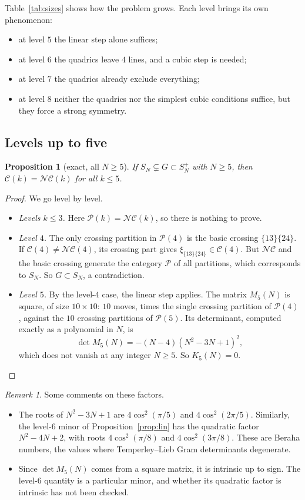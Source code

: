 \documentclass[11pt]{amsart}
\newtheorem{proposition}[theorem]{Proposition}
\theoremstyle{definition}
\theoremstyle{remark}
\newtheorem{remark}[theorem]{Remark}
\theoremstyle{plain}
\numberwithin{equation}{section}
\numberwithin{table}{section}
\newcommand{\NC}{\mathcal{NC}}
\newcommand{\Pp}{\mathcal{P}}
\begin{document}
Table~\ref{tab:sizes} shows how the problem grows. Each level brings its own phenomenon:
\begin{itemize}
\item at level $5$ the linear step alone suffices;
\item at level $6$ the quadrics leave $4$ lines, and a cubic step is needed;
\item at level $7$ the quadrics already exclude everything;
\item at level $8$ neither the quadrics nor the simplest cubic conditions suffice, but they force a strong symmetry.
\end{itemize}

\subsection{Levels up to five}

\begin{proposition}[exact, all $N\ge5$]\label{prop:lowlevels}
If $S_N\subsetneq G\subset S_N^+$ with $N\ge5$, then $\mathcal C(k)=\NC(k)$ for all $k\le5$.
\end{proposition}

\begin{proof}
We go level by level.
\begin{itemize}
\item \emph{Levels $k\le3$.} Here $\Pp(k)=\NC(k)$, so there is nothing to prove.
\item \emph{Level $4$.} The only crossing partition in $\Pp(4)$ is the basic crossing $\{13\}\{24\}$. If $\mathcal C(4)\ne\NC(4)$, its crossing part gives $\xi_{\{13\}\{24\}}\in\mathcal C(4)$. But $\NC$ and the basic crossing generate the category $\Pp$ of all partitions, which corresponds to $S_N$. So $G\subset S_N$, a contradiction.
\item \emph{Level $5$.} By the level-$4$ case, the linear step applies. The matrix $M_5(N)$ is square, of size $10\times10$: $10$ moves, times the single crossing partition of $\Pp(4)$, against the $10$ crossing partitions of $\Pp(5)$. Its determinant, computed exactly as a polynomial in $N$, is
\[
\det M_5(N)=-(N-4)(N^2-3N+1)^2,
\]
which does not vanish at any integer $N\ge5$. So $K_5(N)=0$. \qedhere
\end{itemize}
\end{proof}

\begin{remark}
Some comments on these factors.
\begin{itemize}
\item The roots of $N^2-3N+1$ are $4\cos^2(\pi/5)$ and $4\cos^2(2\pi/5)$. Similarly, the level-$6$ minor of Proposition~\ref{prop:lin} has the quadratic factor $N^2-4N+2$, with roots $4\cos^2(\pi/8)$ and $4\cos^2(3\pi/8)$. These are Beraha numbers, the values where Temperley--Lieb Gram determinants degenerate.
\item Since $\det M_5(N)$ comes from a square matrix, it is intrinsic up to sign. The level-$6$ quantity is a particular minor, and whether its quadratic factor is intrinsic has not been checked.
\end{itemize}
\end{remark}
\end{document}
